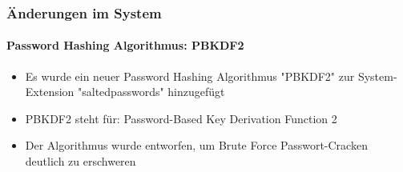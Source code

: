 \begin{frame}[fragile]
	\frametitle{Änderungen im System}
	\framesubtitle{Password Hashing Algorithmus: PBKDF2}

	\begin{itemize}

		\item Es wurde ein neuer Password Hashing Algorithmus "PBKDF2" zur System-Extension "saltedpasswords" hinzugefügt

		\item PBKDF2 steht für: Password-Based Key Derivation Function 2

		\item Der Algorithmus wurde entworfen, um Brute Force Passwort-Cracken deutlich zu erschweren

	\end{itemize}

\end{frame}

